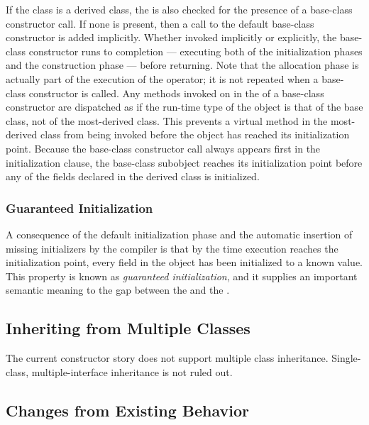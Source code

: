 If the class is a derived class, the  is also
checked for the presence of a base-class constructor call.  If none is present,
then a call to the default base-class constructor is added implicitly.
Whether invoked implicitly or explicitly, the base-class constructor runs to
completion --- executing both of the initialization phases and the construction
phase --- before returning.  Note that the allocation phase is actually part of
the execution of the  operator; it is not repeated when a base-class
constructor is called.
Any methods invoked on  in
the  of a base-class constructor are dispatched as if the
run-time type of the object is that of the base class, not of the most-derived
class.  This prevents a virtual method in the most-derived class from being
invoked before the object has reached its initialization point.  Because the
base-class constructor call always appears first in the initialization clause,
the base-class subobject reaches its initialization point before any of the
fields declared in the derived class is initialized.

\subsubsection{Guaranteed Initialization}
\label{Guaranteed_Initialization}

A consequence of the default initialization phase and the automatic insertion of
missing initializers by the compiler is that by the time execution reaches the
initialization point, every field in the object has been initialized to a known
value.  This property is known as \emph{guaranteed initialization}, and it supplies an
important semantic meaning to the gap between the 
and the .

\subsection{Inheriting from Multiple Classes}
\label{Inheriting_from_Multiple_Classes}

The current constructor story does not support multiple class inheritance.
Single-class, multiple-interface inheritance is not ruled out.

\subsection{Changes from Existing Behavior}

